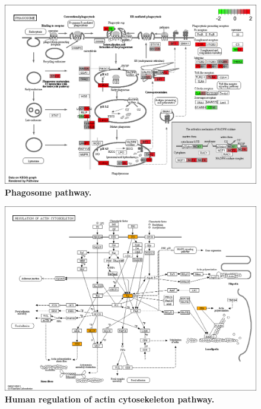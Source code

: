 \documentclass[10pt]{article}
\begin{document}
\begin{figure}[!ht]
    \begin{center}
        \includegraphics[width=6in]{gga04145_degenes_multi.png}
    \end{center}
    \caption{
        {\bf Phagosome pathway.}
    }
    \label{kegg_phagosome}
\end{figure}

\begin{figure}[!ht]
    \begin{center}
        \includegraphics[width=6in]{hsa04810_deu_genes.png}
    \end{center}
    \caption{
        {\bf Human regulation of actin cytosekeleton pathway.}
    }
    \label{kegg_actin}
\end{figure}
\end{document}
